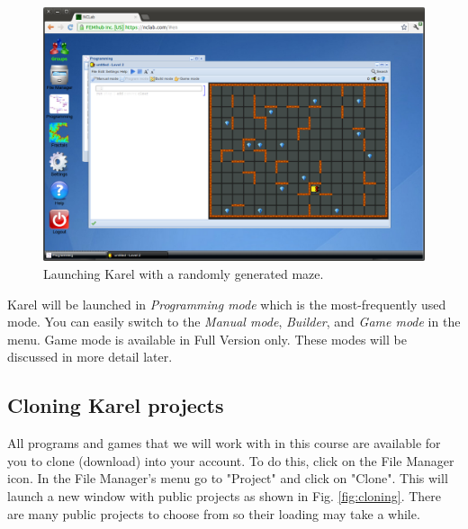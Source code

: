 \documentclass[article,A4,12pt]{llncs}
\begin{document}
\begin{figure}[!ht]
\begin{center}
\includegraphics[width=\textwidth]{img/init.png}
\end{center}
\caption{Launching Karel with a randomly generated maze.}
\label{fig:init}
\end{figure}
\noindent
Karel will be launched in {\em Programming mode} which is the most-frequently 
used mode. You can easily switch to the {\em Manual mode}, {\em Builder},
and {\em Game mode} in the menu. Game mode is available in Full Version only. 
These modes will be discussed in more detail later.

\subsection{Cloning Karel projects} \label{cloning}

All programs and games that we will work with in this course are
available for you to clone (download) into your account. To do this, 
click on the File Manager icon. In the File Manager's menu go to 
"Project" and click on "Clone". This will launch a new window with public
projects as shown in Fig. \ref{fig:cloning}. There are many public
projects to choose from so their loading may take a while. 

\newpage
\end{document}
